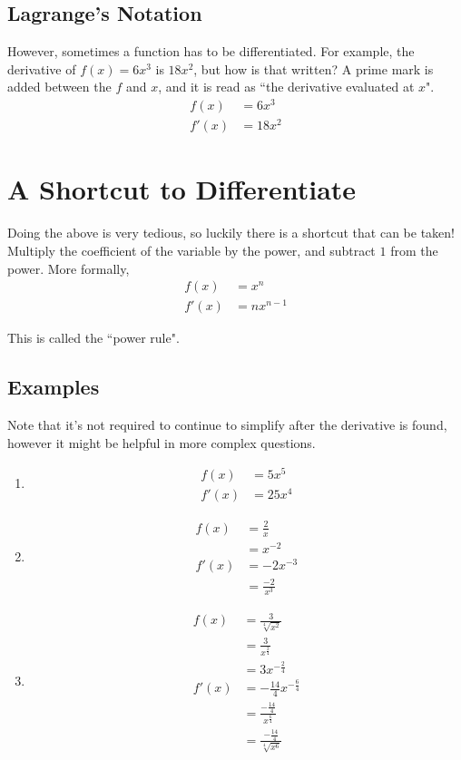 \subsection{Lagrange's Notation}
However, sometimes a function has to be differentiated. For example, the derivative of $f(x) = 6x^3$ is $18x^2$, but how is that written? A prime mark is added between the $f$ and $x$, and it is read as ``the derivative evaluated at $x$".
\begin{align*}
	f(x) &= 6x^3\\
	f'(x) &= 18x^2
\end{align*}


\section{A Shortcut to Differentiate}
Doing the above is very tedious, so luckily there is a shortcut that can be taken! Multiply the coefficient of the variable by the power, and subtract $1$ from the power. More formally,
\begin{align*}
	f(x) &= x^n\\
	f'(x) &= nx^{n-1}
\end{align*}

This is called the ``power rule".

\subsection{Examples}
Note that it's not required to continue to simplify after the derivative is found, however it might be helpful in more complex questions.

\begin{enumerate}
	\item
	\begin{align*}
		f(x) &= 5x^5\\
		f'(x) &= 25x^4
	\end{align*}
	\item
	\begin{align*}
		f(x) &= \frac{2}{x}\\
		&= x^{-2}\\
		f'(x) &= -2x^{-3}\\
		&= \frac{-2}{x^3}
	\end{align*}
	\item 
	\begin{align*}
		f(x) &= \frac{3}{\sqrt[4]{x^2}}\\
		&= \frac{3}{x^{\frac{2}{4}}}\\
		&= 3x^{-\frac{2}{4}}\\
		f'(x) &= -\frac{14}{4}x^{-\frac{6}{4}}\\[0.5em]
		&= \frac{-\frac{14}{4}}{x^{\frac{6}{4}}}\\[0.5em]
		&= \frac{-\frac{14}{4}}{\sqrt[4]{x^6}}
	\end{align*}
\end{enumerate}